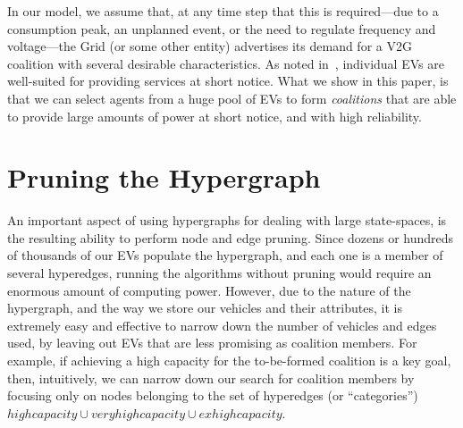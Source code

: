 In our model, we assume that, at any time step that this is required---due to a consumption peak, an unplanned event, or the need to regulate frequency and voltage---the Grid (or some other entity) advertises its demand for a V2G coalition with several desirable characteristics. As noted in~\cite{kamboj2011deploying}, individual EVs are well-suited for providing services at short notice. What we show in this paper, is that we can select agents from a huge pool of EVs to form {\em coalitions} that are able to provide large amounts of power at short notice, and with high reliability.




\section{Pruning the Hypergraph}\label{sec:pruning}

An important aspect of using hypergraphs for dealing with large state-spaces, is the resulting ability to perform node and edge pruning. Since dozens or hundreds of thousands of our EVs populate the hypergraph, and each one is a member of several hyperedges, running the algorithms without pruning would require an enormous amount of computing power. However, due to the nature of the hypergraph, and the way we store our vehicles and their attributes, it is extremely easy and effective to narrow down the number of vehicles and edges used, by leaving out EVs that are less promising as coalition members. For example, if achieving a high capacity for the to-be-formed coalition is a key goal, then, intuitively, we can narrow down our search for coalition members by focusing only on nodes belonging to the set of hyperedges (or ``categories'') $high capacity \cup very high capacity \cup ex high capacity$. 

